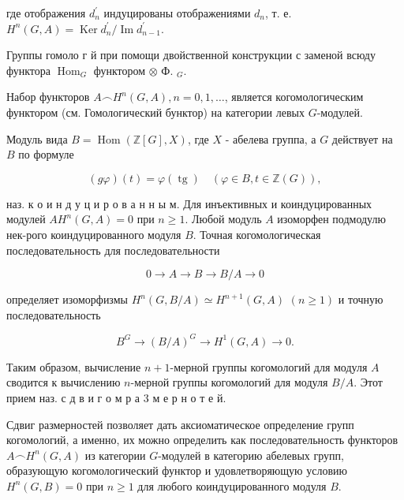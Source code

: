 \documentclass[10pt]{article}
\begin{document}
где отображения $d_{n}^{\prime}$ индуцированы отображениями $d_{n}$, т. е. $H^{n}(G, A)=\operatorname{Ker} d_{n}^{\prime} / \operatorname{Im} d_{n-1}^{\prime}$.



Группы гомоло г й при помощи двойственной конструкции с заменой всюду функтора $\operatorname{Hom}_{G}$ функтором $\otimes$ Ф. $_{G}$.



Набор функторов $A \frown H^{n}(G, A), n=0,1, \ldots$, является когомологическим функтором (см. Гомологический бунктор) на категории левых $G$-модулей.



Модуль вида $B=\operatorname{Hom}(\mathbb{Z}[G], X)$, где $X$ - абелева группа, а $G$ действует на $B$ по формуле



\[

(g \varphi)(t)=\varphi(\operatorname{tg}) \quad(\varphi \in B, t \in \mathbb{Z}(G)),

\]



наз. к о и н д у ц и р о в а н н ы м. Для инъективных и коиндуцированных модулей $A H^{n}(G, A)=0$ при $n \geqslant 1$. Любой модуль $A$ изоморфен подмодулю нек-рого коиндуцированного модуля $B$. Точная когомологическая последовательность для последовательности



\[

0 \longrightarrow A \longrightarrow B \longrightarrow B / A \longrightarrow 0

\]



определяет изоморфизмы $H^{n}(G, B / A) \simeq H^{n+1}(G, A)$ $(n \geqslant 1)$ и точную последовательность



\[

B^{G} \longrightarrow(B / A)^{G} \longrightarrow H^{1}(G, A) \longrightarrow 0 .

\]



Таким образом, вычисление $n+1$-мерной группы когомологий для модуля $A$ сводится к вычислению $n$-мерной группы когомологий для модуля $B / A$. Этот прием наз. с д в и г о м р а 3 м е р н о т е й.



Сдвиг размерностей позволяет дать аксиоматическое определение групп когомологий, а именно, их можно определить как последовательность функторов $A \frown H^{n}(G, A)$ из категории $G$-модулей в категорию абелевых групп, образующую когомологический функтор и удовлетворяющую условию $H^{n}(G, B)=0$ при $n \geqslant 1$ для любого коиндуцированного модуля $B$.
\end{document}
